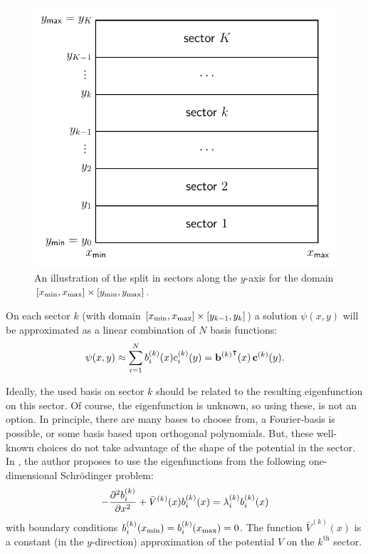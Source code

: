 \begin{figure}
  \begin{center}
    \includegraphics[width=.6\textwidth]{img/chapter3/2dsectors.pdf}
    \caption{\label{fig:c3_2dsectors} An illustration of the split in sectors along the $y$-axis for the domain $[{x_{\text{min}}}, {x_{\text{max}}}]\times[{y_{\text{min}}}, {y_{\text{max}}}]$.}
  \end{center}
\end{figure}

On each sector $k$ (with domain $[{x_{\text{min}}}, {x_{\text{max}}}]\times[y_{k-1}, y_k]$) a solution $\psi(x, y)$ will be approximated as a linear combination of $N$ basis functions:
\begin{equation}\label{equ:c3_lincomb_basis}
  \psi(x, y) \approx \sum_{i=1}^{N} b_i^{(k)}(x) c_i^{(k)}(y) = {{\vb{b}^{(k)}}}^\intercal(x) \, \vb{c}^{(k)}(y) \text{.}
\end{equation}

Ideally, the used basis on sector $k$ should be related to the resulting eigenfunction on this sector. Of course, the eigenfunction is unknown, so using these, is not an option. In principle, there are many bases to choose from, a Fourier-basis is possible, or some basis based upon orthogonal polynomials. But, these well-known choices do not take advantage of the shape of the potential in the sector. In \cite{ixaru_new_2010}, the author proposes to use the eigenfunctions from the following one-dimensional Schrödinger problem:
\begin{equation}\label{equ:c3_one_dimensional_schrodinger}
  -\pdv[2]{b_i^{(k)}}{x} + \bar{V}^{(k)}(x)b_i^{(k)}(x) = \lambda_i^{(k)} b_i^{(k)}(x)
\end{equation}
with boundary conditions $b_i^{(k)}({x_{\text{min}}}) = b_i^{(k)}({x_{\text{max}}}) = 0$. The function $\bar{V}^{(k)}(x)$ is a constant (in the $y$-direction) approximation of the potential $V$ on the $k^\text{th}$ sector.

